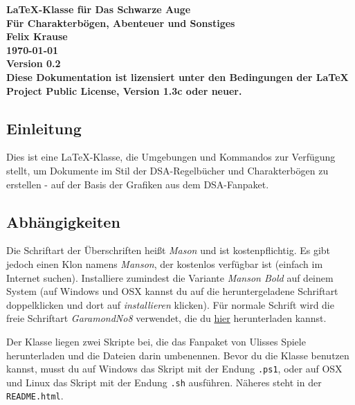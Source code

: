 \documentclass{dsa}
\begin{document}
   \begin{dsaTitlePage}
      \bfseries \Huge \LaTeX-Klasse für Das Schwarze Auge \\[15pt]
      \LARGE Für Charakterbögen, Abenteuer und Sonstiges \\[40pt]
      {\large \normalfont Felix Krause \\[10pt] \today \\[10pt] Version 0.2} \\[15pt]
      {\small \normalfont Diese Dokumentation ist lizensiert unter den Bedingungen der
       LaTeX Project Public License, Version 1.3c oder neuer.}
   \end{dsaTitlePage}
      
   
   \subsection*{Einleitung}
   
   Dies ist eine \LaTeX-Klasse, die Umgebungen und Kommandos zur Verfügung
   stellt, um Dokumente im Stil der DSA-Regelbücher und Charakterbögen zu 
   erstellen - auf der Basis der Grafiken aus dem DSA-Fanpaket.
   
   \subsection*{Abhängigkeiten}
   
   Die Schriftart der Überschriften heißt \textit{Mason} und ist
   kostenpflichtig. Es gibt jedoch einen Klon namens \textit{Manson}, der
   kostenlos verfügbar ist (einfach im Internet suchen). Installiere zumindest
   die Variante \textit{Manson Bold} auf deinem System (auf Windows und OSX
   kannst du auf die heruntergeladene Schriftart doppelklicken und dort auf
   \textit{installieren} klicken). Für normale Schrift wird die freie Schriftart
   \textit{GaramondNo8} verwendet, die du \href{http://garamond.org}{hier}
   herunterladen kannst.
   
   Der Klasse liegen zwei Skripte bei, die das Fanpaket von Ulisses Spiele
   herunterladen und die Dateien darin umbenennen. Bevor du die Klasse benutzen
   kannst, musst du auf Windows das Skript mit der Endung \texttt{.ps1}, oder
   auf OSX und Linux das Skript mit der Endung \texttt{.sh} ausführen. Näheres
   steht in der \texttt{README.html}.
   
\end{document}
